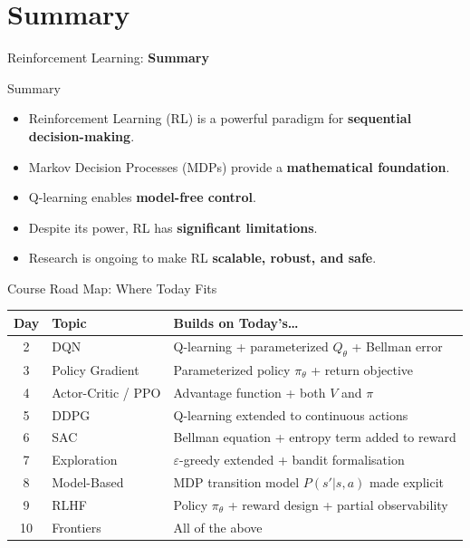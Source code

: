 \section{Summary}
\begin{frame}{}
    \LARGE Reinforcement Learning: \textbf{Summary}
\end{frame}

\begin{frame}{Summary}
    \begin{itemize}
        \item Reinforcement Learning (RL) is a powerful paradigm for \textbf{sequential decision-making}.
        \item Markov Decision Processes (MDPs) provide a \textbf{mathematical foundation}.
        \item Q-learning enables \textbf{model-free control}.
        \item Despite its power, RL has \textbf{significant limitations}.
        \item Research is ongoing to make RL \textbf{scalable, robust, and safe}.
    \end{itemize}
\end{frame}

\begin{frame}{Course Road Map: Where Today Fits}
    \centering
    \begin{tabular}{c l l}
    \hline
    \textbf{Day} & \textbf{Topic} & \textbf{Builds on Today's\ldots} \\
    \hline
    2 & DQN & Q-learning + parameterized $Q_\theta$ + Bellman error \\
    3 & Policy Gradient & Parameterized policy $\pi_\theta$ + return objective \\
    4 & Actor-Critic / PPO & Advantage function + both $V$ and $\pi$ \\
    5 & DDPG & Q-learning extended to continuous actions \\
    6 & SAC & Bellman equation + entropy term added to reward \\
    7 & Exploration & $\varepsilon$-greedy extended + bandit formalisation \\
    8 & Model-Based & MDP transition model $P(s'|s,a)$ made explicit \\
    9 & RLHF & Policy $\pi_\theta$ + reward design + partial observability \\
    10 & Frontiers & All of the above \\
    \hline
    \end{tabular}
\end{frame}